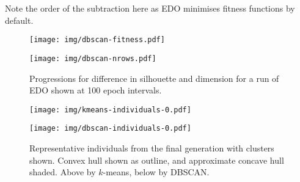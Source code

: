 Note the order of the subtraction here as EDO minimises fitness functions by
default.

\begin{figure}[htbp]
    \centering
    \begin{minipage}{\imgwidth}
        \centering
        \texttt{[image: img/dbscan-fitness.pdf]}
    \end{minipage}

    \begin{minipage}{\imgwidth}
        \centering
        \texttt{[image: img/dbscan-nrows.pdf]}
    \end{minipage}
    \caption{Progressions for difference in silhouette and dimension for a run
             of EDO shown at 100 epoch
             intervals.}\label{figure:dbscan-silhouette}
\end{figure}

\begin{figure}[htbp]
    \centering
    \texttt{[image: img/kmeans-individuals-0.pdf]}

    \texttt{[image: img/dbscan-individuals-0.pdf]}
    \caption{Representative individuals from the final generation with
             clusters shown. Convex hull shown as outline, and approximate
             concave hull shaded. Above by \(k\)-means, below by
             DBSCAN.}\label{figure:dbscan-individuals}
\end{figure}

